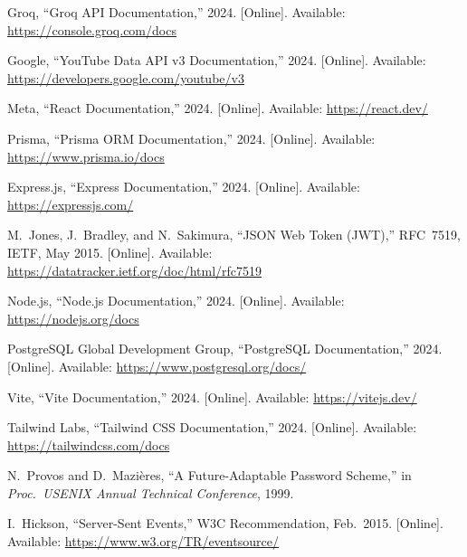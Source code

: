 \documentclass[12pt,a4paper]{report}
\begin{document}
\begin{enumerate}[label={[\arabic*]},noitemsep]
    \item Groq, ``Groq API Documentation,'' 2024. [Online]. Available: \url{https://console.groq.com/docs}
    \item Google, ``YouTube Data API v3 Documentation,'' 2024. [Online]. Available: \url{https://developers.google.com/youtube/v3}
    \item Meta, ``React Documentation,'' 2024. [Online]. Available: \url{https://react.dev/}
    \item Prisma, ``Prisma ORM Documentation,'' 2024. [Online]. Available: \url{https://www.prisma.io/docs}
    \item Express.js, ``Express Documentation,'' 2024. [Online]. Available: \url{https://expressjs.com/}
    \item M.\ Jones, J.\ Bradley, and N.\ Sakimura, ``JSON Web Token (JWT),'' RFC~7519, IETF, May 2015. [Online]. Available: \url{https://datatracker.ietf.org/doc/html/rfc7519}
    \item Node.js, ``Node.js Documentation,'' 2024. [Online]. Available: \url{https://nodejs.org/docs}
    \item PostgreSQL Global Development Group, ``PostgreSQL Documentation,'' 2024. [Online]. Available: \url{https://www.postgresql.org/docs/}
    \item Vite, ``Vite Documentation,'' 2024. [Online]. Available: \url{https://vitejs.dev/}
    \item Tailwind Labs, ``Tailwind CSS Documentation,'' 2024. [Online]. Available: \url{https://tailwindcss.com/docs}
    \item N.\ Provos and D.\ Mazi\`{e}res, ``A Future-Adaptable Password Scheme,'' in \emph{Proc.\ USENIX Annual Technical Conference}, 1999.
    \item I.\ Hickson, ``Server-Sent Events,'' W3C Recommendation, Feb.\ 2015. [Online]. Available: \url{https://www.w3.org/TR/eventsource/}
\end{enumerate}
\end{document}
